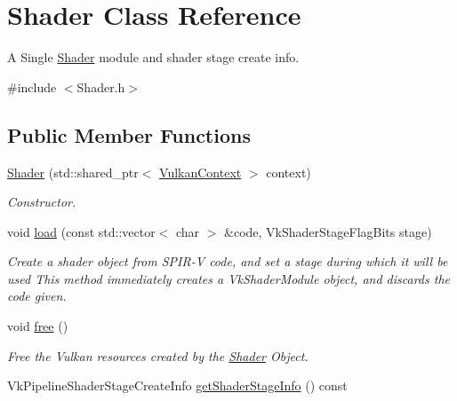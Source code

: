 \hypertarget{class_shader}{}\section{Shader Class Reference}
\label{class_shader}


A Single \mbox{\hyperlink{class_shader}{Shader}} module and shader stage create info.  




{\ttfamily \#include $<$Shader.\+h$>$}

\subsection*{Public Member Functions}
\begin{DoxyCompactItemize}
\item 
\mbox{\hyperlink{class_shader_ac7ee3d9c3c847af0280af86264a2293a}{Shader}} (std\+::shared\+\_\+ptr$<$ \mbox{\hyperlink{class_vulkan_context}{Vulkan\+Context}} $>$ context)
\begin{DoxyCompactList}\small\item\em Constructor. \end{DoxyCompactList}\item 
void \mbox{\hyperlink{class_shader_a6dd75dee2ed363e1ecc5caed85fe92ba}{load}} (const std\+::vector$<$ char $>$ \&code, Vk\+Shader\+Stage\+Flag\+Bits stage)
\begin{DoxyCompactList}\small\item\em Create a shader object from S\+P\+I\+R-\/V code, and set a stage during which it will be used This method immediately creates a Vk\+Shader\+Module object, and discards the code given. \end{DoxyCompactList}\item 
\mbox{\label{class_shader_a28a9274fb00f980dd5f7f89f10809100}} 
void \mbox{\hyperlink{class_shader_a28a9274fb00f980dd5f7f89f10809100}{free}} ()
\begin{DoxyCompactList}\small\item\em Free the Vulkan resources created by the \mbox{\hyperlink{class_shader}{Shader}} Object. \end{DoxyCompactList}\item 
\mbox{\label{class_shader_a741b7724aab486e8f802a1a9db73de82}} 
Vk\+Pipeline\+Shader\+Stage\+Create\+Info \mbox{\hyperlink{class_shader_a741b7724aab486e8f802a1a9db73de82}{get\+Shader\+Stage\+Info}} () const

\end{DoxyCompactItemize}
